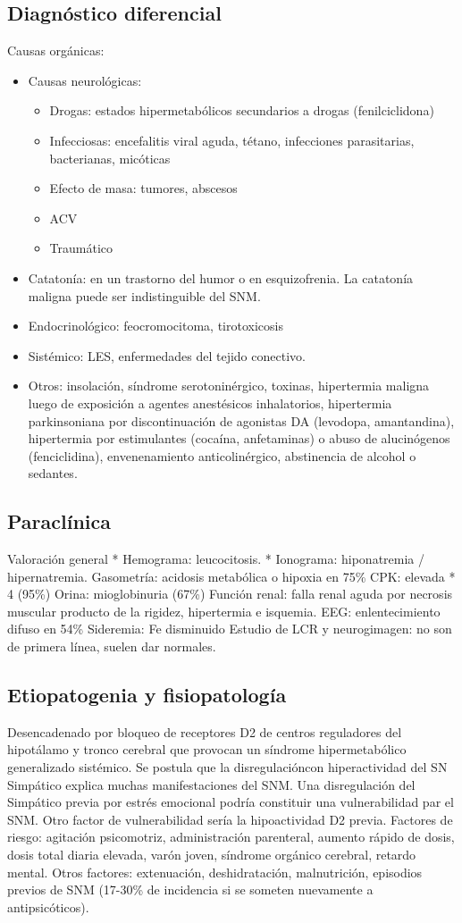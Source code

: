 \subsection*{Diagnóstico diferencial}
Causas orgánicas:
\begin{itemize}
	\item Causas neurológicas:
	\begin{itemize}
		\item Drogas: estados hipermetabólicos secundarios a drogas (fenilciclidona)
		\item Infecciosas: encefalitis viral aguda, tétano, infecciones parasitarias, bacterianas, micóticas
		\item Efecto de masa: tumores, abscesos
		\item ACV
		\item Traumático
	\end{itemize}
	\item Catatonía: en un trastorno del humor o en esquizofrenia. La catatonía maligna puede ser indistinguible del SNM.
	\item Endocrinológico: feocromocitoma, tirotoxicosis
	\item Sistémico: LES, enfermedades del tejido conectivo.
	\item Otros: insolación, síndrome serotoninérgico, toxinas, hipertermia maligna luego de exposición a agentes anestésicos inhalatorios, hipertermia parkinsoniana por discontinuación de agonistas DA (levodopa, amantandina), hipertermia por estimulantes (cocaína, anfetaminas) o abuso de alucinógenos (fenciclidina), envenenamiento anticolinérgico, abstinencia de alcohol o sedantes.
\end{itemize}
\subsection*{Paraclínica}
Valoración general
* Hemograma: leucocitosis.
* Ionograma: hiponatremia / hipernatremia.
Gasometría: acidosis metabólica o hipoxia en 75\%
CPK: elevada * 4 (95\%)
Orina: mioglobinuria (67\%)
Función renal: falla renal aguda por necrosis muscular producto de la rigidez, hipertermia e isquemia.
EEG: enlentecimiento difuso en 54\%
Sideremia: Fe disminuido
Estudio de LCR y neurogimagen: no son de primera línea, suelen dar normales.
\subsection*{Etiopatogenia y fisiopatología}
Desencadenado por bloqueo de receptores D2 de centros reguladores del hipotálamo y tronco cerebral que provocan un síndrome hipermetabólico generalizado sistémico. Se postula que la disregulacióncon hiperactividad del SN Simpático explica muchas manifestaciones del SNM. 
Una disregulación del Simpático previa por estrés emocional podría constituir una vulnerabilidad par el SNM. Otro factor de vulnerabilidad sería la hipoactividad D2 previa.
Factores de riesgo: agitación psicomotriz, administración parenteral, aumento rápido de dosis, dosis total diaria elevada, varón joven, síndrome orgánico cerebral, retardo mental.
Otros factores: extenuación, deshidratación, malnutrición, episodios previos de SNM (17-30\% de incidencia si se someten nuevamente a antipsicóticos).

